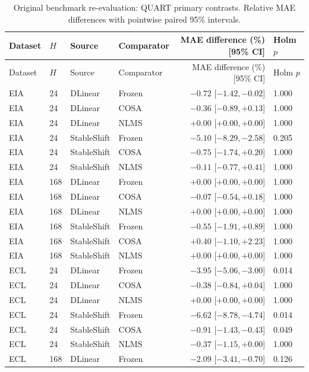 \begin{longtable}{lllp{}rp{}}
\caption{Original benchmark re-evaluation: QUART primary contrasts. Relative MAE differences with pointwise paired 95\% intervals.}\label{tab:test_primary}\\
\toprule
Dataset & $H$ & Source & Comparator & MAE difference (\%) [95\% CI] & Holm $p$\\
\midrule
\endfirsthead
\toprule
Dataset & $H$ & Source & Comparator & MAE difference (\%) [95\% CI] & Holm $p$\\
\midrule
\endhead
EIA & 24 & DLinear & Frozen & $-0.72$ [$ -1.42, -0.02 $] & 1.000\\
EIA & 24 & DLinear & COSA & $-0.36$ [$ -0.89, +0.13 $] & 1.000\\
EIA & 24 & DLinear & NLMS & $+0.00$ [$ +0.00, +0.00 $] & 1.000\\
EIA & 24 & StableShift & Frozen & $-5.10$ [$ -8.29, -2.58 $] & 0.205\\
EIA & 24 & StableShift & COSA & $-0.75$ [$ -1.74, +0.20 $] & 1.000\\
EIA & 24 & StableShift & NLMS & $-0.11$ [$ -0.77, +0.41 $] & 1.000\\
EIA & 168 & DLinear & Frozen & $+0.00$ [$ +0.00, +0.00 $] & 1.000\\
EIA & 168 & DLinear & COSA & $-0.07$ [$ -0.54, +0.18 $] & 1.000\\
EIA & 168 & DLinear & NLMS & $+0.00$ [$ +0.00, +0.00 $] & 1.000\\
EIA & 168 & StableShift & Frozen & $-0.55$ [$ -1.91, +0.89 $] & 1.000\\
EIA & 168 & StableShift & COSA & $+0.40$ [$ -1.10, +2.23 $] & 1.000\\
EIA & 168 & StableShift & NLMS & $+0.00$ [$ +0.00, +0.00 $] & 1.000\\
ECL & 24 & DLinear & Frozen & $-3.95$ [$ -5.06, -3.00 $] & 0.014\\
ECL & 24 & DLinear & COSA & $-0.38$ [$ -0.84, +0.04 $] & 1.000\\
ECL & 24 & DLinear & NLMS & $+0.00$ [$ +0.00, +0.00 $] & 1.000\\
ECL & 24 & StableShift & Frozen & $-6.62$ [$ -8.78, -4.74 $] & 0.014\\
ECL & 24 & StableShift & COSA & $-0.91$ [$ -1.43, -0.43 $] & 0.049\\
ECL & 24 & StableShift & NLMS & $-0.37$ [$ -1.15, +0.00 $] & 1.000\\
ECL & 168 & DLinear & Frozen & $-2.09$ [$ -3.41, -0.70 $] & 0.126\\

\end{longtable}
